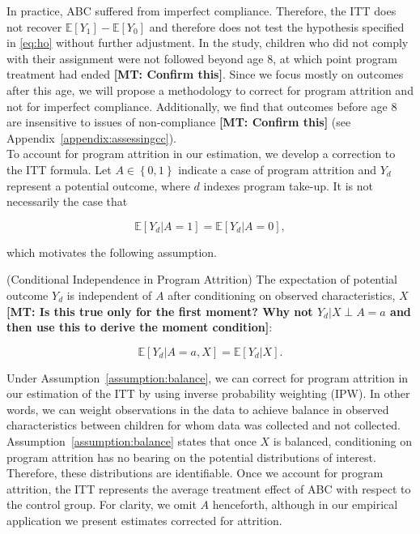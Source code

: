 \noindent In practice, ABC suffered from imperfect compliance. Therefore, the ITT does not recover $ \mathbb{E} \left[ Y_{1} \right] - \mathbb{E} \left[ Y_{0} \right] $ and therefore does not test the hypothesis specified in \eqref{eq:ho} without further adjustment. In the study, children who did not comply with their assignment were not followed beyond age 8, at which point program treatment had ended \textbf{[MT: Confirm this]}. Since we focus mostly on outcomes after this age, we will propose a methodology to correct for program attrition and not for imperfect compliance. Additionally, we find that outcomes before age 8 are insensitive to issues of non-compliance \textbf{[MT: Confirm this]} (see Appendix~\ref{appendix:assessingcc}).\\

\noindent To account for program attrition in our estimation, we develop a correction to the ITT formula. Let $A \in \left \{ 0,1 \right \}$ indicate a case of program attrition and $Y_{d} $ represent a potential outcome, where $d$ indexes program take-up. It is not necessarily the case that 

\begin{equation}
\mathbb{E} \left[ Y_{d} |  A = 1 \right]  = \mathbb{E} \left[ Y_{d} | A = 0  \right],
\end{equation}

\noindent which motivates the following assumption. 

\begin{assumption} \normalfont \label{assumption:balance} (Conditional Independence in Program Attrition) The expectation of potential outcome $Y_{d}$ is independent of $A$ after conditioning on observed characteristics, $X$ \textbf{[MT: Is this true only for the first moment? Why not $ Y_{d} | X \perp A = a $ and then use this to derive the moment condition]}: 

\begin{equation}
\mathbb{E} \left[ Y_{d} | A = a, X \right] = \mathbb{E} \left[ Y_{d} | X \right].
\end{equation}

\end{assumption}

\noindent Under Assumption~\ref{assumption:balance}, we can correct for program attrition in our estimation of the ITT by using inverse probability weighting (IPW). In other words, we can weight observations in the data to achieve balance in observed characteristics between children for whom data was collected and not collected. Assumption~\ref{assumption:balance} states that once $X$ is balanced, conditioning on program attrition has no bearing on the potential distributions of interest. Therefore, these distributions are identifiable. Once we account for program attrition, the ITT represents the average treatment effect of ABC with respect to the control group. For clarity, we omit $A$ henceforth, although in our empirical application we present estimates corrected for attrition.\\

